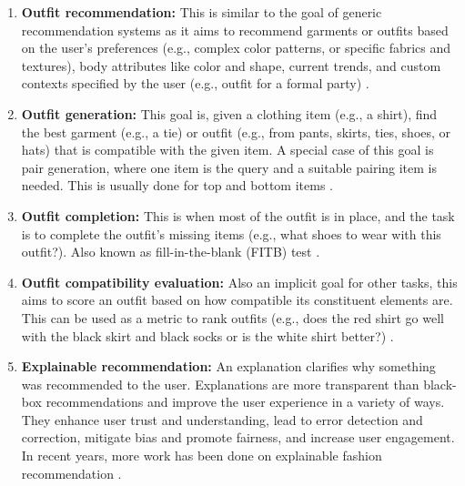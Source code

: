 		\begin{enumerate}
			\item \textbf{Outfit recommendation:} This is similar to the goal of generic recommendation systems as it aims to recommend garments or outfits based on the user's preferences (e.g., complex color patterns, or specific fabrics and textures), body attributes like color and shape, current trends, and custom contexts specified by the user (e.g., outfit for a formal party) \cite{DBLP:conf/sigir/LiW0CXC20, 9156794, 8932738, DBLP:conf/mm/HidayatiHCHFC18, DBLP:journals/tmm/ZhangJGZZLT17, DBLP:conf/waim/ShaWZFZY16}.
			
			\item \textbf{Outfit generation:} This goal is, given a clothing item (e.g., a shirt), find the best garment (e.g., a tie) or outfit (e.g., from pants, skirts, ties, shoes, or hats) that is compatible with the given item. A special case of this goal is pair generation, where one item is the query and a suitable pairing item is needed. This is usually done for top and bottom items \cite{9156535, 9893574, DBLP:conf/kdd/ChenHXGGSLPZZ19}.
			
			\item \textbf{Outfit completion:} This is when most of the outfit is in place, and the task is to complete the outfit's missing items (e.g., what shoes to wear with this outfit?). Also known as fill-in-the-blank (FITB) test \cite{9857004, DBLP:journals/corr/abs-2005-06584, DBLP:conf/mm/SongHLCXN19}.
			
			\item \textbf{Outfit compatibility evaluation:} Also an implicit goal for other tasks, this aims to score an outfit based on how compatible its constituent elements are. This can be used as a metric to rank outfits (e.g., does the red shirt go well with the black skirt and black socks or is the white shirt better?) \cite{DBLP:journals/eswa/MoZPW23, 10049142, DBLP:journals/eswa/BalimO23,9775146, DBLP:conf/iccvw/KimSMSSP21, DBLP:journals/ijon/SunHWZP20, DBLP:conf/sigir/DongWSDN20, DBLP:conf/www/YinL0019, DBLP:conf/aaai/YangMLWC19}.

			\item \textbf{Explainable recommendation:} An explanation clarifies why something was recommended to the user. Explanations are more transparent than black-box recommendations and improve the user experience in a variety of ways. They enhance user trust and understanding, lead to error detection and correction, mitigate bias and promote fairness, and increase user engagement. In recent years, more work has been done on explainable fashion recommendation \cite{DBLP:journals/tomccap/YangSFWDN21, DBLP:journals/www/LiCH21, 9522737, DBLP:journals/tkde/LinRCRMR20, DBLP:conf/wacv/TangsengO20, DBLP:conf/ijcai/HouWCLZL19, DBLP:conf/sigir/ChenCXZ0QZ19}.
		\end{enumerate}
		
